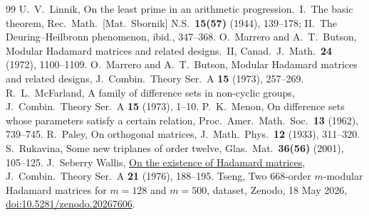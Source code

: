 \documentclass[10pt]{article}
\theoremstyle{remark}
\begin{document}
\begin{footnotesize}
\begin{thebibliography}{99}
 U.~V.~Linnik, On the least prime in an arithmetic progression.\ I.\ The basic theorem, Rec.\ Math.\ [Mat.\ Sbornik] N.S.\ \textbf{15(57)} (1944), 139--178; II.\ The Deuring--Heilbronn phenomenon, ibid., 347--368.
 O.~Marrero and A.~T.~Butson, Modular Hadamard matrices and related designs.\ II, Canad.\ J.\ Math.\ \textbf{24} (1972), 1100--1109.
 O.~Marrero and A.~T.~Butson, Modular Hadamard matrices and related designs, J.\ Combin.\ Theory Ser.\ A \textbf{15} (1973), 257--269.
 R.~L.~McFarland, A family of difference sets in non-cyclic groups, J.\ Combin.\ Theory Ser.\ A \textbf{15} (1973), 1--10.
 P.~K.~Menon, On difference sets whose parameters satisfy a certain relation, Proc.\ Amer.\ Math.\ Soc.\ \textbf{13} (1962), 739--745.
 R.~Paley, On orthogonal matrices, J.\ Math.\ Phys.\ \textbf{12} (1933), 311--320.
 S.~Rukavina, Some new triplanes of order twelve, Glas.\ Mat.\ \textbf{36(56)} (2001), 105--125.
J.~Seberry Wallis, \href{https://doi.org/10.1016/0097-3165(76)90062-5}{On the existence of Hadamard matrices}, J.\ Combin.\ Theory Ser.\ A \textbf{21} (1976), 188--195.
 Tseng, Two 668-order $m$-modular Hadamard matrices for $m=128$ and $m=500$, dataset, Zenodo, 18 May 2026, \href{https://doi.org/10.5281/zenodo.20267606}{doi:10.5281/zenodo.20267606}.
\end{thebibliography}
\end{footnotesize}
\end{document}
